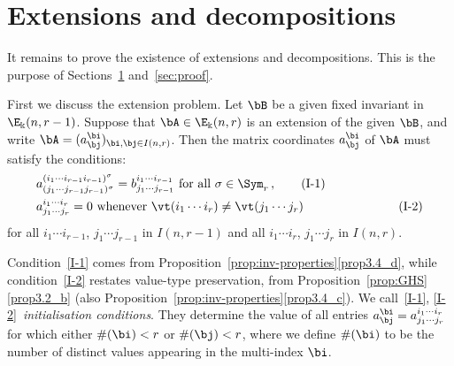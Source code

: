 \section{Extensions and decompositions}\label{sec:extensions}%
It remains to prove the existence of extensions and
decompositions. This is the purpose of Sections~\ref{sec:extensions}
and~\ref{sec:proof}. 

First we discuss the extension problem. Let $\bB$ be a given fixed
invariant in $\E_\Bbbk(n,r-1)$. Suppose that $\bA \in \E_\Bbbk(n,r)$
is an extension of the given $\bB$, and write $\bA =
(a^\bi_\bj)_{\bi,\bj \in I(n,r)}$. Then the matrix coordinates
$a^\bi_\bj$ of $\bA$ must satisfy the conditions:
\begin{align}
 & a^{(i_1\cdots i_{r-1} i_{r-1})^\sigma}_{(j_1\cdots j_{r-1}
 j_{r-1})^\sigma} = b^{i_1\cdots i_{r-1}}_{j_1\cdots j_{r-1}} \text{ for
 all } \sigma \in \Sym_r \, , \tag{I-1} \label{I-1}\\
 & a^{i_1\cdots i_r}_{j_1\cdots j_r} = 0 \text{ whenever }
 \vt(i_1\cdots i_r) \ne \vt(j_1 \cdots j_r) \hspace{2cm}\tag{I-2}\label{I-2}
\end{align}
for all $i_1\cdots i_{r-1}$, $j_1\cdots j_{r-1}$ in $I(n,r-1)$ and all
$i_1\cdots i_r$, $j_1\cdots j_r$ in $I(n,r)$.

Condition~\eqref{I-1} comes from Proposition~\ref{prop:inv-properties}\ref{prop3.4_d},
while condition~\eqref{I-2} restates value-type preservation, from
Proposition~\ref{prop:GHS}\ref{prop3.2_b} (also Proposition~\ref{prop:inv-properties}\ref{prop3.4_c}). We call~\eqref{I-1}, \eqref{I-2}~\emph{initialisation conditions}. They determine the value of all
entries $a^\bi_\bj = a^{i_1 \cdots i_r}_{j_1\cdots j_r}$ for which
either $\#(\bi)<r$ or $\#(\bj)<r$, where we define $\#(\bi)$ to be the
number of distinct values appearing in the multi-index $\bi$. 

